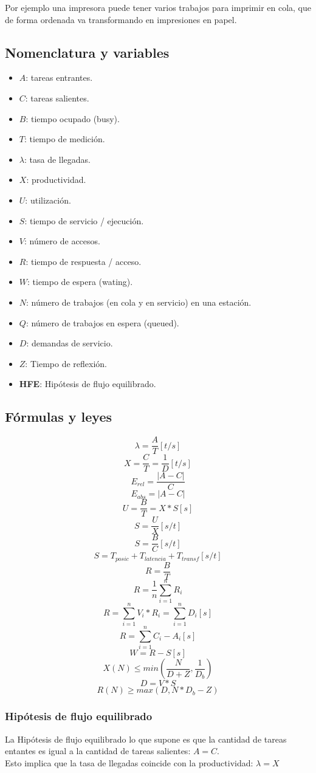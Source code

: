 Por ejemplo una impresora puede tener varios trabajos para imprimir en cola, que de forma ordenada va transformando en impresiones en papel.
\newpage
\subsection{Nomenclatura y variables}
\begin{itemize}
    \item $A$: tareas entrantes.
    \item $C$: tareas salientes.
    \item $B$: tiempo ocupado (busy).
    \item $T$: tiempo de medición.
    \item $\lambda$: tasa de llegadas.
    \item $X$: productividad.
    \item $U$: utilización.
    \item $S$: tiempo de servicio / ejecución.
    \item $V$: número de accesos.
    \item $R$: tiempo de respuesta / acceso.
    \item $W$: tiempo de espera (wating).
    \item $N$: número de trabajos (en cola y en servicio) en una estación.
    \item $Q$: número de trabajos en espera (queued).
    \item $D$: demandas de servicio.
    \item $Z$: Tiempo de reflexión.
    \item \textbf{HFE}: Hipótesis de flujo equilibrado.
\end{itemize}
\subsection{Fórmulas y leyes}
\begin{multicols}{2}
\[\lambda = \frac{A}{T}[t/s]\]
\[X = \frac{C}{T} = \frac{1}{D}[t/s]\]
\[E_{rel}= \frac{|A-C|}{C}\]
\[E_{abs}=|A-C|\]
\[U = \frac{B}{T}=X*S[s]\]
\[S = \frac{U}{X}[s/t]\]
\[S = \frac{B}{C}[s/t]\]
\[S=T_{posic}+T_{latencia}+T_{transf}[s/t]\]
\[R = \frac{B}{T}\]
\[R= \frac{1}{n}\sum_{i=1}^{n}R_i\]
\[R = \sum_{i=1}^{n}V_i*R_i = \sum_{i=1}^{n}D_i[s]\]
\[R = \sum_{i=1}^{n}C_i-A_i[s]\]
\[W = R-S[s]\]
\[X(N)\leq min(\frac{N}{D+Z}, \frac{1}{D_b})\]
\[D=V*S\]
\[R(N)\geq max(D, N*D_b-Z)\]
\end{multicols}

\subsubsection{Hipótesis de flujo equilibrado}
    La Hipótesis de flujo equilibrado lo que supone es que la cantidad de tareas entantes es igual a la cantidad de tareas salientes: $A = C$.\\
    Esto implica que la tasa de llegadas coincide con la productividad: $\lambda = X$
